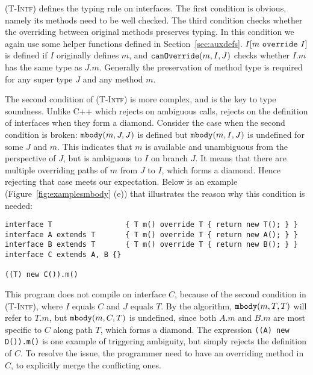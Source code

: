 \textsc{(T-Intf)} defines the typing rule on interfaces. The first condition is obvious, namely its methods need to be well checked. The third
condition checks whether the overriding between original methods preserves typing. In this condition we again use some helper functions defined in  Section~\ref{sec:auxdefs}. $I[m\ \texttt{override}\ I]$ is defined if $I$ originally defines $m$, and $\texttt{canOverride}(m, I, J)$ checks whether $I.m$ has the same type as $J.m$. Generally the preservation of method type is required for any super type $J$ and any method $m$.

The second condition of \textsc{(T-Intf)} is more complex, and is the key to type soundness. Unlike C++ which rejects on ambiguous calls,
\MIM{} rejects on the definition of interfaces when they form a diamond. Consider the case when the second condition is broken: $\texttt{mbody}(m, J, J)$
is defined but $\texttt{mbody}(m, I, J)$ is undefined for some $J$ and $m$. This indicates that $m$ is available and unambiguous from the perspective of $J$,
but is ambiguous to $I$ on branch $J$. It means that there are multiple overriding paths of $m$ from $J$ to $I$, which forms a diamond. Hence rejecting
that case meets our expectation. Below is an example (Figure~\ref{fig:examplesmbody} (e)) that illustrates the reason why this condition is needed:
 
\vspace{3pt}\begin{lstlisting}
interface T                 { T m() override T { return new T(); } }
interface A extends T       { T m() override T { return new A(); } }
interface B extends T       { T m() override T { return new B(); } }
interface C extends A, B {}

((T) new C()).m()
\end{lstlisting}\vspace{3pt}
This program does not compile on interface $C$, because of the second condition in \textsc{(T-Intf)}, where $I$ equals $C$ and $J$ equals $T$.
By the algorithm, $\texttt{mbody}(m, T, T)$ will refer to $T.m$, but $\texttt{mbody}(m, C, T)$ is undefined, since both $A.m$ and $B.m$ are most specific
to $C$ along path $T$, which forms a diamond. The expression \lstinline|((A) new D()).m()| is one example of triggering ambiguity, but \MIM{}
simply rejects the definition of $C$. To resolve the issue, the programmer need to have an overriding method in $C$, to explicitly merge
the conflicting ones.

